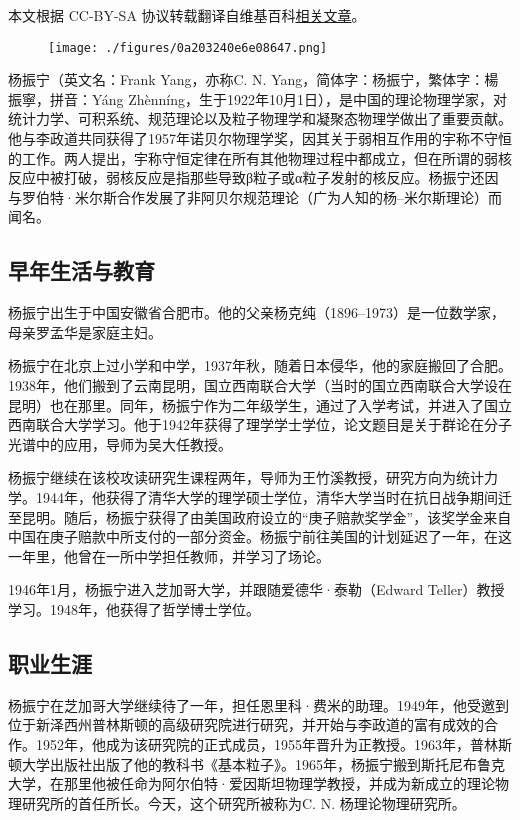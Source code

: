 
本文根据 CC-BY-SA 协议转载翻译自维基百科\href{https://en.wikipedia.org/wiki/Yang_Chen-Ning}{相关文章}。

\begin{figure}[ht]
\centering
\texttt{[image: ./figures/0a203240e6e08647.png]}
\caption{} \label{fig_YZL_1}
\end{figure}
杨振宁（英文名：Frank Yang，亦称C. N. Yang，简体字：杨振宁，繁体字：楊振寧，拼音：Yáng Zhènníng，生于1922年10月1日），是中国的理论物理学家，对统计力学、可积系统、规范理论以及粒子物理学和凝聚态物理学做出了重要贡献。他与李政道共同获得了1957年诺贝尔物理学奖，因其关于弱相互作用的宇称不守恒的工作。两人提出，宇称守恒定律在所有其他物理过程中都成立，但在所谓的弱核反应中被打破，弱核反应是指那些导致β粒子或α粒子发射的核反应。杨振宁还因与罗伯特·米尔斯合作发展了非阿贝尔规范理论（广为人知的杨–米尔斯理论）而闻名。
\subsection{早年生活与教育}
杨振宁出生于中国安徽省合肥市。他的父亲杨克纯（1896–1973）是一位数学家，母亲罗孟华是家庭主妇。

杨振宁在北京上过小学和中学，1937年秋，随着日本侵华，他的家庭搬回了合肥。1938年，他们搬到了云南昆明，国立西南联合大学（当时的国立西南联合大学设在昆明）也在那里。同年，杨振宁作为二年级学生，通过了入学考试，并进入了国立西南联合大学学习。他于1942年获得了理学学士学位，论文题目是关于群论在分子光谱中的应用，导师为吴大任教授。

杨振宁继续在该校攻读研究生课程两年，导师为王竹溪教授，研究方向为统计力学。1944年，他获得了清华大学的理学硕士学位，清华大学当时在抗日战争期间迁至昆明。随后，杨振宁获得了由美国政府设立的“庚子赔款奖学金”，该奖学金来自中国在庚子赔款中所支付的一部分资金。杨振宁前往美国的计划延迟了一年，在这一年里，他曾在一所中学担任教师，并学习了场论。

1946年1月，杨振宁进入芝加哥大学，并跟随爱德华·泰勒（Edward Teller）教授学习。1948年，他获得了哲学博士学位。
\subsection{职业生涯}
杨振宁在芝加哥大学继续待了一年，担任恩里科·费米的助理。1949年，他受邀到位于新泽西州普林斯顿的高级研究院进行研究，并开始与李政道的富有成效的合作。1952年，他成为该研究院的正式成员，1955年晋升为正教授。1963年，普林斯顿大学出版社出版了他的教科书《基本粒子》。1965年，杨振宁搬到斯托尼布鲁克大学，在那里他被任命为阿尔伯特·爱因斯坦物理学教授，并成为新成立的理论物理研究所的首任所长。今天，这个研究所被称为C. N. 杨理论物理研究所。

